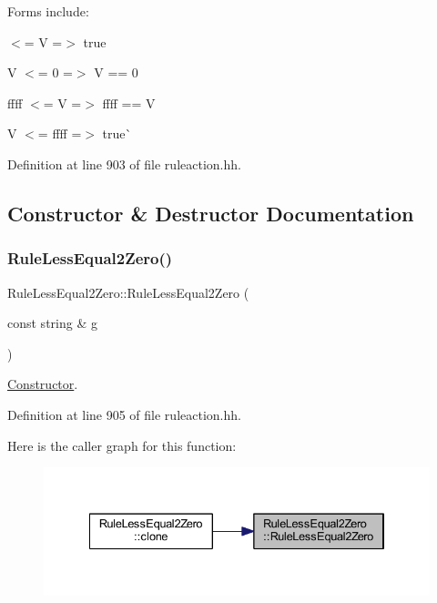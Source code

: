 Forms include\+:
\begin{DoxyItemize}
\item { $<$= V =$>$ true}
\item {\ttfamily V $<$= 0 =$>$ V == 0}
\item {\ttfamily ffff $<$= V =$>$ ffff == V}
\item {\ttfamily V $<$= ffff} =$>$ true\`{} 
\end{DoxyItemize}

Definition at line 903 of file ruleaction.\+hh.



\subsection{Constructor \& Destructor Documentation}
\mbox{\label{class_rule_less_equal2_zero_a84fa90c33d058dab82aa8df56623f251}} 
\subsubsection{\texorpdfstring{RuleLessEqual2Zero()}{RuleLessEqual2Zero()}}
{\footnotesize\ttfamily Rule\+Less\+Equal2\+Zero\+::\+Rule\+Less\+Equal2\+Zero (\begin{DoxyParamCaption}\item[{const string \&}]{g }\end{DoxyParamCaption})\hspace{0.3cm}{\ttfamily [inline]}}



\mbox{\hyperlink{class_constructor}{Constructor}}. 



Definition at line 905 of file ruleaction.\+hh.

Here is the caller graph for this function\+:
\nopagebreak
\begin{figure}[H]
\begin{center}
\leavevmode
\includegraphics[width=334pt]{class_rule_less_equal2_zero_a84fa90c33d058dab82aa8df56623f251_icgraph}
\end{center}
\end{figure}


